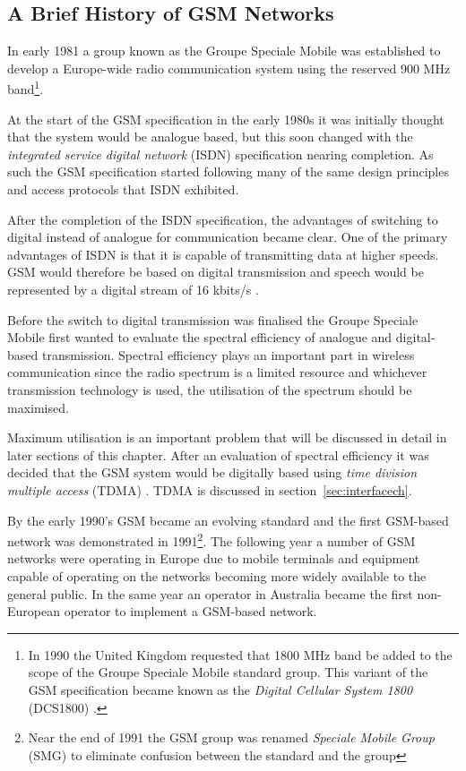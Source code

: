 \subsection{A Brief History of GSM Networks}
\label{sec:gsmhistory}
In early 1981 a group known as the Groupe Speciale Mobile was established to develop a Europe-wide radio communication system using the reserved 900 MHz band\footnote{In 1990 the United Kingdom requested that 1800 MHz band be added to the scope of the Groupe Speciale Mobile standard group. This variant of the GSM specification became known as the \emph{Digital Cellular System 1800} (DCS1800) \cite{GSM92,Karen2004}.}\cite{GSM92,Karen2004}.

At the start of the GSM specification in the early 1980s it was initially thought that the system would be analogue based, but this soon changed with the \emph{integrated service digital network} (ISDN) specification nearing completion. As such the GSM specification started following many of the same design principles and access protocols that ISDN exhibited\cite{GSM92}.

After the completion of the ISDN specification, the advantages of switching to digital instead of analogue for communication became clear. One of the primary advantages of ISDN is that it is capable of transmitting data at higher speeds. GSM would therefore be based on digital transmission and speech would be represented by a digital stream of 16 kbits/s \cite{GSM92}.

Before the switch to digital transmission was finalised the Groupe Speciale Mobile first wanted to evaluate the spectral efficiency of analogue and digital-based transmission\cite{GSM92}. Spectral efficiency plays an important part in wireless communication since the radio spectrum is a limited resource and whichever transmission technology is used, the utilisation of the spectrum should be maximised\cite{GSM92}. 

Maximum utilisation is an important problem that will be discussed in detail in later sections of this chapter. After an evaluation of spectral efficiency it was decided that the GSM system would be digitally based using \emph{time division multiple access} (TDMA) \cite{GSM92,GSMSysEngin}. TDMA is discussed in section~\ref{sec:interfacech}.

By the early 1990’s GSM became an evolving standard and the first GSM-based network was demonstrated in 1991\footnote{Near the end of 1991 the GSM group was renamed \emph{Speciale Mobile Group} (SMG) to eliminate confusion between the standard and the group}\cite{GSMArchitectureProtocolsServices,Eisenblatter}. The following year a number of GSM networks were operating in Europe due to mobile terminals and equipment capable of operating on the networks becoming more widely available to the general public\cite{GSM92,Eisenblatter}. In the same year an operator in Australia became the first non-European operator to implement a GSM-based network\cite{Eisenblatter}.


